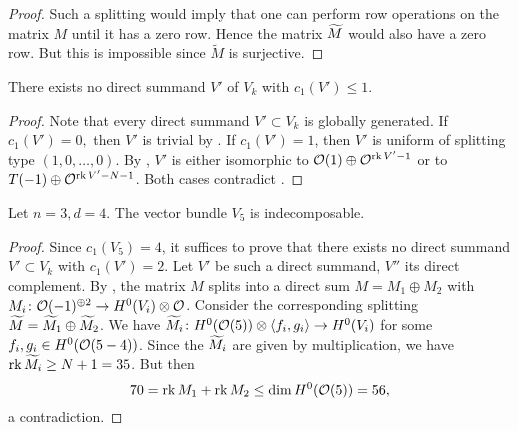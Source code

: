 \begin{proof}
	Such a splitting would imply that one can perform row operations on the matrix $M$ until it has a zero row. Hence the matrix $\widetilde M$ would also have a zero row. But this is impossible since $\widetilde M$ is surjective.
\end{proof}

\begin{proposition}
	There exists no direct summand $V'$ of $V_k$ with $c_1(V')\leq 1$.
\end{proposition}

\begin{proof}
	Note that every direct summand $V'\subset V_k$ is globally generated. If $c_1(V')=0,$ then $V'$ is trivial by \cite[Thm.\ 3.2.1]{okonek-schneider-spindler}. If $c_1(V')=1$, then $V'$ is uniform of splitting type $(1,0,\dotsc,0)$. By \cite[IV – 2.2.: Prop]{ellia-fibres-uniformes}, $V'$ is either isomorphic to $\mathcal{O}(1)\oplus \mathcal{O}^{\operatorname{rk} V' - 1}$ or to $T(-1)\oplus \mathcal{O}^{\operatorname{rk} V' - N - 1}$. Both cases contradict
	.
\end{proof}

\begin{proposition}
	Let $n=3,d=4$. The vector bundle $V_5$ is indecomposable.
\end{proposition}

\begin{proof}
	Since $c_1(V_5)=4$, it suffices to prove that there exists no direct summand $V'\subset V_k$ with $c_1(V')=2$. Let $V'$ be such a direct summand, $V''$ its direct complement. By , the matrix $M$ splits into a direct sum $M=M_1\oplus M_2$ with $M_i\colon \mathcal{O}(-1)^{\oplus 2} \to H^0(V_i)\otimes \mathcal{O}$. Consider the corresponding splitting $\widetilde M= \widetilde M_1 \oplus \widetilde M_2$. We have
	$\widetilde M_i \colon H^0(\mathcal{O}(5))\otimes \left\langle f_i,g_i \right\rangle \to H^0(V_i)$ for some $f_i,g_i \in H^0(\mathcal{O}(5-4))$. Since the $\widetilde M_i$ are given by multiplication, we have $\operatorname{rk} \widetilde M_i \geq N+1 = 35$. But then
	\[
	70 = \operatorname{rk} M_1 + \operatorname{rk} M_2 \leq \dim H^0(\mathcal{O}(5))=56,
	\] a contradiction.
\end{proof}
